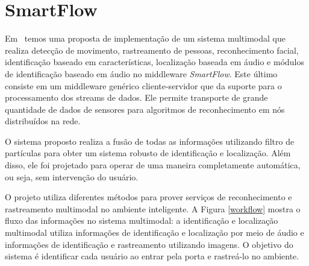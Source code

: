 
\section{SmartFlow}

Em~\cite{salah} temos uma proposta de implementação de um sistema multimodal que realiza detecção de movimento, rastreamento de pessoas, reconhecimento facial, identificação baseado em características, localização baseada em áudio e módulos de identificação baseado em áudio no middleware \textit{SmartFlow}. Este último consiste em um middleware genérico cliente-servidor que da suporte para o processamento dos streams de dados. Ele permite transporte de grande quantidade de dados de sensores para algoritmos de reconhecimento em nós distribuídos na rede.

O sistema proposto realiza a fusão de todas as informações utilizando filtro de partículas para obter um sistema robusto de identificação e localização. Além disso, ele foi projetado para operar de uma maneira completamente automática, ou seja, sem intervenção do usuário.



O projeto utiliza diferentes métodos para prover serviços de reconhecimento e rastreamento multimodal no ambiente inteligente. A Figura \ref{workflow} mostra o fluxo das informações no sistema multimodal: a identificação e localização multimodal utiliza informações de identificação e localização por meio de áudio e informações de identificação e rastreamento utilizando imagens. O objetivo do sistema é identificar cada usuário ao entrar pela porta e rastreá-lo no ambiente. 

